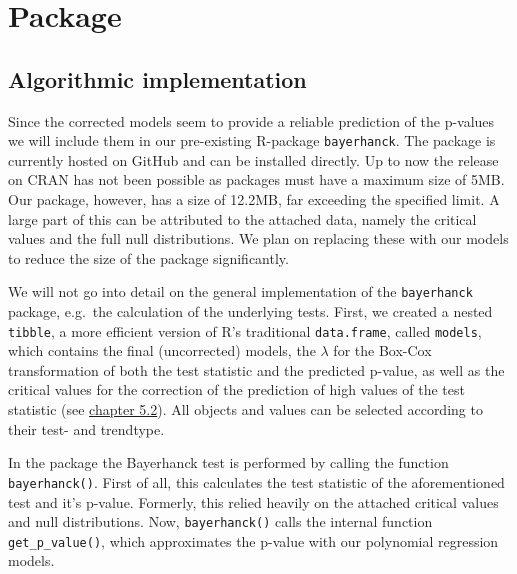 \documentclass[12pt,a4paper]{article}
\begin{document}
\hypertarget{package}{%
\section{Package}\label{package}}

\hypertarget{algorithmic-implementation}{%
\subsection{Algorithmic
implementation}\label{algorithmic-implementation}}

Since the corrected models seem to provide a reliable prediction of the
p-values we will include them in our pre-existing R-package
\texttt{bayerhanck}. The package is currently hosted on GitHub and can
be installed directly. Up to now the release on CRAN has not been
possible as packages must have a maximum size of 5MB. Our package,
however, has a size of 12.2MB, far exceeding the specified limit. A
large part of this can be attributed to the attached data, namely the
critical values and the full null distributions. We plan on replacing
these with our models to reduce the size of the package significantly.

We will not go into detail on the general implementation of the
\texttt{bayerhanck} package, e.g.~the calculation of the underlying
tests. First, we created a nested \texttt{tibble}, a more efficient
version of R's traditional \texttt{data.frame}, called \texttt{models},
which contains the final (uncorrected) models, the \(\lambda\) for the
Box-Cox transformation of both the test statistic and the predicted
p-value, as well as the critical values for the correction of the
prediction of high values of the test statistic (see
\protect\hyperlink{correction-for-high-values-of-the-test-statistic}{chapter
5.2}). All objects and values can be selected according to their test-
and trendtype.

In the package the Bayerhanck test is performed by calling the function
\texttt{bayerhanck()}. First of all, this calculates the test statistic
of the aforementioned test and it's p-value. Formerly, this relied
heavily on the attached critical values and null distributions. Now,
\texttt{bayerhanck()} calls the internal function
\texttt{get\_p\_value()}, which approximates the p-value with our
polynomial regression models.
\end{document}
